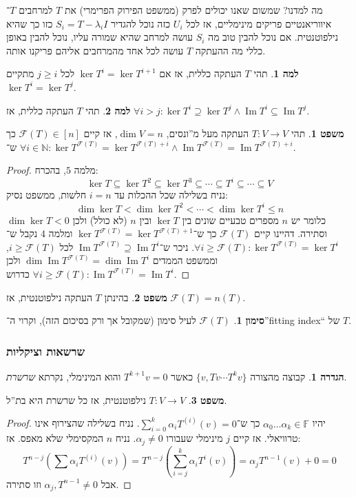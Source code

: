 \documentclass[a4paper]{article}
\newcommand\N     {\mathbb{N}}
\newcommand\fc    {\mathcal{F}}
\DeclareMathOperator\Img   {Im}
\newcommand\F         {\mathbb{F}}
\newcommand\co        {\colon}
\newcommand\ag        {\alpha}
\renewcommand\lg      {\lambda}
\newcommand\cl [1]    {\left ( #1 \right )}
\theoremstyle{definition}
\newtheorem{Theorem}{\color{myblue}משפט}
\newtheorem{Definition}{\color{mygreen}הגדרה}
\newtheorem{Lemma}{\color{myyellow}למה}
\newtheorem{Notion}{\color{myred}סימון}
\newcommand\theo  [1] {\begin{Theorem}#1\end{Theorem}}
\newcommand\defi  [1] {\begin{Definition}#1\end{Definition}}
\newcommand\lem   [1] {\begin{Lemma}#1\end{Lemma}}
\newcommand\noti  [1] {\begin{Notion}#1\end{Notion}}
\begin{document}
	מה למדנו? שמשום שאנו יכולים לפרק (ממשפט הפירוק הפרימרי) את $T$ למרחבים $T$־איווריאנטיים פריקים מינימליים, אז לכל $U_i$ כזה נוכל להגדיר $S_i = T - \lg_i I$ כזו כך שהיא נילפוטנטית. אם נוכל להבין טוב מה $S_i$ עושה למרחב שהיא שמורה עליו, נוכל להבין באופן כללי מה ההעתקה $T$ עושה לכל אחד מהמרחבים אליהם פריקנו אותה. 	
	
	\lem{תהי $T$ העתקה כללית, אז אם $\ker T^{i}  = \ker T^{i + 1}$ לכל $j \ge i$ מתקיים $\ker T^{i} = \ker T^{j}$. }
	\lem{תהי $T$ העתקה כללית, אז $\forall i > j \co \ker T^{i} \supseteq \ker T^{j} \land \Img T^{i} \subseteq \Img T^{j}$. }
	
	\theo{תהי $T \co V \to V$ העתקה מעל מ''ונסים, $\dim V = n$, אז קיים $\fc(T) \in [n]$ כך ש־
		$\forall i \in \N \co \ker T^{\fc(T)} = \ker T^{\fc(T) + i} \land \Img T^{\fc(T)} = \Img T^{\fc(T) + i}$. }
	\begin{proof}
		מלמה $5$, בהכרח: 
		\[ \ker T \subseteq \ker T^{2} \subseteq \ker T^{3} \subseteq \cdots \subseteq T^{i} \subseteq \cdots \subseteq V \]
		נניח בשלילה שכל ההכלות עד $i = n$ חלשות, ממשפט נסיק: 
		\[ \dim \ker T < \dim \ker T^{2} < \cdots < \dim \ker T^{i} \le n \]
		כלומר יש $n$ מספרים טבעיים שונים בין $\ker T$ ובין $n$ (לא כולל) ולכן $\dim \ker T < 0$ וסתירה. דהיינו קיים $\fc(T)$ כך ש־$\ker T^{\fc(T)} = \ker T^{\fc(T) + 1}$ ומלמה 4 נקבל ש־$\forall i \ge \fc(T) \co \ker T^{\fc(T)}  = \ker T^{i}$. ניכר ש־$\Img T^{\fc(T)} \supseteq \Img T^{i}$ לכל $i \ge \fc(T)$, וממשפט הממדים $\dim \Img T^{\fc(T)}  = \dim \Img T^{i}$ ולכן $\forall i \ge \fc(T) \co \Img T^{\fc(T)} = \Img T^{i}$ כדרוש. 
	\end{proof}
	\theo{בהינתן $T$ העתקה נילפוטנטית, אז $\fc(T) = n(T)$. }
	\noti{$\fc(T)$ לעיל סימון (שמקובל אך ורק בסיכום הזה), וקרוי ה־''fitting index`` של $T$. }
	
	
	\subsubsection{שרשאות וציקליות}
	
	\defi{קבוצה מהצורה $\{v, Tv \cdots T^kv\}$ כאשר $T^{k + 1}v = 0$ והוא המינימלי, נקרתא \textit{שרשרת}. }
	
	\theo{$T \co V \to V$ נילפוטנטית, אז כל שרשרת היא בת''ל. }
	\begin{proof}
		יהיו $\ag_0 \dots \ag_k \in \F$ כך ש־$\sum_{i = 0}^{k}\ag_i T^{(i)}(v) = 0$. נניח בשלילה שהצירוף אינו טרוויאלי. אז קיים $j$ מינימלי שעבורו $\ag_j \neq 0$. נניח $n$ המקסימלי שלא מאפס. אז: 
		\[ T^{n - j}\cl{\sum \ag_i T^{(i)}(v)} = T^{n - j}\cl{\sum_{i = j}^{k}\ag_iT^{i}(v)} = \ag_jT^{n - 1}(v) + 0 = 0 \]
		אבל $\ag_j, T^{n - 1} \neq 0$ וזו סתירה. 
	\end{proof}
	
\end{document}
